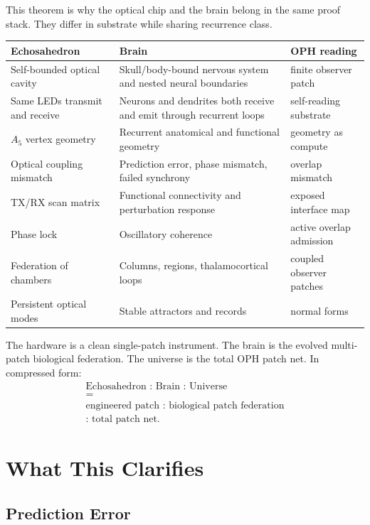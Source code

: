 \documentclass[11pt]{article}
\theoremstyle{remark}
\theoremstyle{plain}
\begin{document}
This theorem is why the optical chip and the brain belong in the same proof stack. They differ in substrate while sharing recurrence class.

\begin{longtable}{L{0.28\textwidth}L{0.30\textwidth}L{0.32\textwidth}}
\toprule
\textbf{Echosahedron} & \textbf{Brain} & \textbf{OPH reading} \\
\midrule
\endhead
Self-bounded optical cavity & Skull/body-bound nervous system and nested neural boundaries & finite observer patch \\
Same LEDs transmit and receive & Neurons and dendrites both receive and emit through recurrent loops & self-reading substrate \\
\(A_5\) vertex geometry & Recurrent anatomical and functional geometry & geometry as compute \\
Optical coupling mismatch & Prediction error, phase mismatch, failed synchrony & overlap mismatch \\
TX/RX scan matrix & Functional connectivity and perturbation response & exposed interface map \\
Phase lock & Oscillatory coherence & active overlap admission \\
Federation of chambers & Columns, regions, thalamocortical loops & coupled observer patches \\
Persistent optical modes & Stable attractors and records & normal forms \\
\bottomrule
\end{longtable}

The hardware is a clean single-patch instrument. The brain is the evolved multi-patch biological federation. The universe is the total OPH patch net. In compressed form:
\[
\boxed{
\begin{gathered}
\text{Echosahedron : Brain : Universe}\\
=\\
\text{engineered patch : biological patch federation}\\
\text{: total patch net}.
\end{gathered}
}
\]

\section{What This Clarifies}

\subsection{Prediction Error}
\end{document}
